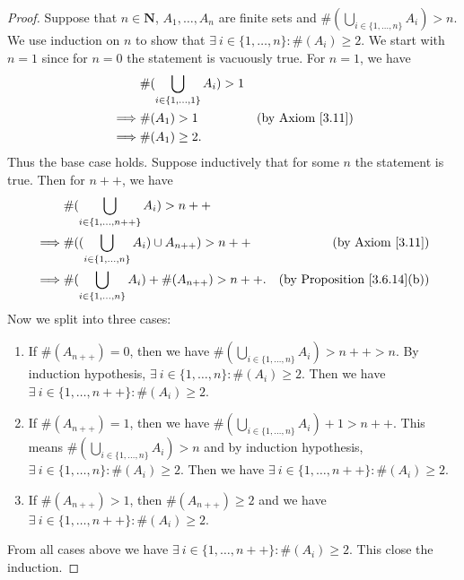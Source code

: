 \begin{proof}
    Suppose that \(n \in \mathbf{N}\), \(A_1, \dots, A_n\) are finite sets and \(\#(\bigcup_{i \in \{1, \dots, n\}} A_i) > n\).
    We use induction on \(n\) to show that \(\exists\ i \in \{1, \dots, n\} : \#(A_i) \geq 2\).
    We start with \(n = 1\) since for \(n = 0\) the statement is vacuously true.
    For \(n = 1\), we have
    \begin{align*}
                 & \#(\bigcup_{i \in \{1, \dots, 1\}} A_i) > 1                                \\
        \implies & \#(A_1) > 1                                 & \text{(by Axiom \ref{3.11})} \\
        \implies & \#(A_1) \geq 2.
    \end{align*}
    Thus the base case holds.
    Suppose inductively that for some \(n\) the statement is true.
    Then for \(n++\), we have
    \begin{align*}
                 & \#(\bigcup_{i \in \{1, \dots, n++\}} A_i) > n++                                                        \\
        \implies & \#((\bigcup_{i \in \{1, \dots, n\}} A_i) \cup A_{n++}) > n++ & \text{(by Axiom \ref{3.11})}            \\
        \implies & \#(\bigcup_{i \in \{1, \dots, n\}} A_i) + \#(A_{n++}) > n++. & \text{(by Proposition \ref{3.6.14}(b))}
    \end{align*}
    Now we split into three cases:
    \begin{enumerate}
        \item If \(\#(A_{n++}) = 0\), then we have \(\#(\bigcup_{i \in \{1, \dots, n\}} A_i) > n++ > n\).
              By induction hypothesis, \(\exists\ i \in \{1, \dots, n\} : \#(A_i) \geq 2\).
              Then we have \(\exists\ i \in \{1, \dots, n++\} : \#(A_i) \geq 2\).
        \item If \(\#(A_{n++}) = 1\), then we have \(\#(\bigcup_{i \in \{1, \dots, n\}} A_i) + 1 > n++\).
              This means \(\#(\bigcup_{i \in \{1, \dots, n\}} A_i) > n\) and by induction hypothesis, \(\exists\ i \in \{1, \dots, n\} : \#(A_i) \geq 2\).
              Then we have \(\exists\ i \in \{1, \dots, n++\} : \#(A_i) \geq 2\).
        \item If \(\#(A_{n++}) > 1\), then \(\#(A_{n++}) \geq 2\) and we have \(\exists\ i \in \{1, \dots, n++\} : \#(A_i) \geq 2\).
    \end{enumerate}
    From all cases above we have \(\exists\ i \in \{1, \dots, n++\} : \#(A_i) \geq 2\).
    This close the induction.
\end{proof}